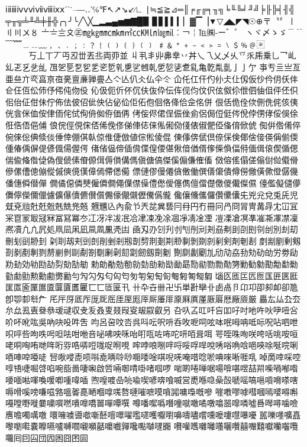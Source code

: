 ⅰⅱⅲⅳⅴⅵⅶⅷⅸⅹˊˋ˙–―‥‵℅℉↖↗↘↙∕∟
∣≒≦≧⊿═║╒╓╔╕╖╗╘╙╚╛╜╝╞╟╠╡╢╣
╤╥╦╧╨╩╪╫╬╭╮╯╰╱╲╳▁▂▃▄▅▆▇█▉
▊▋▌▍▎▏▓▔▕▼▽◢◣◤◥☉⊕〒〝〞〡〢〣〤〥
〦〧〨〩㊣㎎㎏㎜㎝㎞㎡㏄㏎㏑㏒㏕︰￢￤℡㈱‐ー゛゜
ヽヾ〆ゝゞ﹉﹊﹋﹌﹍﹎﹏﹐﹑﹒﹔﹕﹖﹗﹙﹚﹛﹜﹝﹞
﹟﹠﹡﹢﹣﹤﹥﹦﹨﹩﹪﹫〾⿰⿱⿲⿳⿴⿵
⿶⿷⿸⿹⿺⿻丂丄丅丆丏丒丗丟丠両丣並
丩丮丯丱丳丵丷丼乀乁乂乄乆乊乑乕乗乚乛乢乣乤乥乧乨
乪乫乬乭乮乯乲乴乵乶乷乸乹乺乻乼乽乿亀亁亃亄⼅亅亇
亊亐亖亗亙亜亝亣亪亯亰亱亴亶亷亸亹亼亽亾仈仌仏仐仒
仚仛仜仠仢仦仧仩仭仮仯仱仴仸仹仺仼仾伀伂伃伄伅伆伇
伈伋伌伒伓伔伕伖伜伝伡伣伨伩伬伭伮伱伳伵伷伹伻伾伿
佀佁佂佄佅佇佈佉佊佋佌佒佔佖佡佢佦佨佪佫佭佮佱佲併
佷佸佹佺佽侀侁侂侅侇侊侌侎侐侒侓侕侘侙侚侜侞侟価侢
侤侫侭侰侱侲侳侴侶侷侸侹侺侻侼侽侾俀俁俆俇俈俉俋俌
俍俒俓俔俕俖俙俛俢俤俥俧俫俬俰俲俴俵俶俷俹俻俼俽俿
倁倂倃倄倅倇倈倊倎倐倓倕倖倗倛倝倞倠倢倣値倧倯倰倱
倲倳倴倵倶倷倸倹倻倽倿偀偁偂偄偅偆偊偋偍偐偑偒偓偔
偖偗偘偙偛偝偞偟偠偡偢偣偤偦偧偨偩偪偫偭偮偯偰偱偲
偳偸偹偺偼偽傁傂傃傄傆傇傉傊傋傌傎傏傐傑傒傓傔傕傗
傚傛傜傝傞傟傠傡傤傦傪傫傮傯傰傱傶傸傹傼傽傿僀僁僃
僄僆僇僈僊僋僌働僎僐僒僓僔僗僘僙僛僜僝僟僠僡僢僣僤
僩僪僫僯僰僱僲僴僶僷僸僺僼僽僾僿儁儃儅儊儌儍儎儏儑
儓儖儗儙儚儛儜儝儞儠儢儣儤儥儦儧儨儩儫儬儭儮儯儰儱
儳儴儵儶儸儹儽儾兂兇兊兌兎兏児兓兗兘兙兛兝兞兟兠兡
兣兤兦內兪兯兲兺兾兿冃冄円冇冊冋冎冏冐冑冓冔冘冚冝
冞冟冡冣冦冧冨冩冪冭冮冴冸冹冺冾冿凁凂凃凅凈凊凎凐
凒凓凔凕凖凗凘凙凚凜凞凟凢凣凥処凧凨凩凪凬凮凲凴凷
凾刄刅刉刋刌刏刐刓刔刕刜刞刟刡刢刣別刦刧刪刬刯刱刲
刴刵刼刾剅剆剈剉剎剏剒剓剕剗剘剙剚剝剟剠剢剣剤剦剨
剫剬剭剰剱剳剶剷剸剹剺剻剼剾劀劄劅劆劋劎劏劒劔劕劖
劗劘劙劚劜劤劥劦劧劮劯劰労劵劶劷劸効劺劻劼劽勀勂勄
勅勆勈勊勌勍勎勏勑勓勔勗勚勜勠勡勣勥勦勧勨勩勪勫勬
勭勮勯勲勳勴勶勷勻勼勽匁匂匃匄匇匉匊匋匌匎匑匒匓匔
匘匛匜匞匟匢匤匥匧匨匩匫匬匰匲匳匴匵匶匷⼖匸匼匽卂
卄卆卋卌卍卐単卙卛卝卥卨卪卬卭卲卶卹卻卼卽卾厀厁厃
厇厈厊厎厏厐厑厒厓厔厖厗厛厜厞厡厤厧厪厫厬厯厰厱厳
厵厷厸厹厺厼厽厾叀叄叅叆叇収叏叐叒叓叕叚叜叝叞叡叧
叴叺叾叿吀吂吅吇吋吔吘吙吚吜吢吤吥吪吰吳吶吷吺吽吿
呁呂呄呅呇呉呌呍呎呏呑呚呝呞呟呠呡呣呥呧呩呪呫呬呭
呮呯呰呴呹呺呾呿咁咃咅咇咈咉咊咍咑咓咗咘咜咞咟咠咡
咢咥咮咰咲咵咶咷咹咺咾哃哅哊哋哖哘哛哠哢哣哤哫哬哯
哰哱哴哵哶哷哸哹哻哾唀唂唃唅唈唊唋唌唍唎唒唓唕唖唗
唘唙唚唜唝唞唟唡唥唦唨唩唫唭唲唴唵唶唸唹唺唻唽啀啂
啅啇啈啋啌啍啎啑啒啔啗啘啙啚啛啝啟啠啢啣啨啩啫啯啰
啱啲啳啴啹啺啽啿喅喆喌喍喎喐喒喓喕喖喗喚喛喞喠喡喢
喣喤喥喦喨喩喫喭喯喰喴営喸喺喼喿嗀嗁嗂嗃嗈嗊嗋嗏嗐
嗕嗗嗘嗙嗛嗞嗠嗢嗧嗭嗮嗰嗱嗴嗸嗹嗺嗻嗼嗿嘂嘃嘄嘅嘇
嘊嘋嘐嘑嘒嘓嘕嘙嘚嘝嘠嘡嘢嘥嘦嘨嘪嘫嘳嘷嘺嘼嘽嘾噀
噂噃噄噅噆噇噈噉噊噋噏噐噑噒噓噕噖噚噛噞噟噡噣噧噭
噮噰噳噵噷噺噽噾噿嚁嚂嚃嚄嚈嚉嚊嚋嚍嚐嚑嚒嚔嚖嚗嚘
嚚嚛嚜嚝嚞嚟嚠嚡嚢嚤嚥嚧嚩嚪嚫嚬嚭嚰嚱嚲嚵嚸嚹嚺嚻
嚽嚾嚿囃囄囆囇囋囍囎囏囐囒囓囕囖囘囙囜団囥囦囧囨囩
